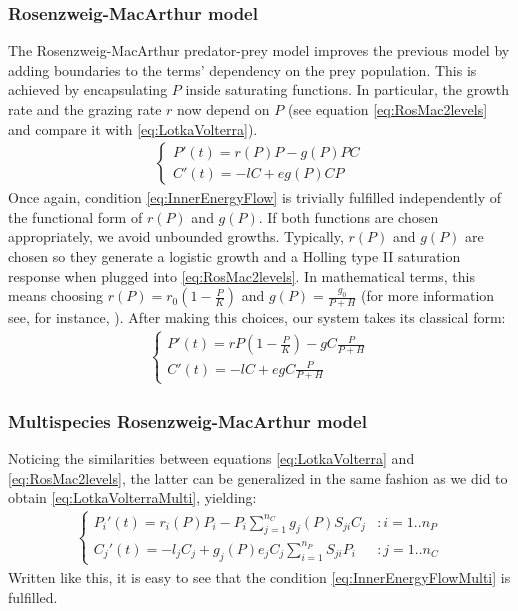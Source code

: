 \subsubsection{Rosenzweig-MacArthur model}
\label{subsubsec:Rosenzweig-MacArthur}
The Rosenzweig-MacArthur predator-prey model improves the previous model by adding boundaries to the terms' dependency on the prey population. This is achieved by encapsulating $P$ inside saturating functions. In particular, the growth rate and the grazing rate $r$ now depend on $P$ (see equation \ref{eq:RosMac2levels} and compare it with \ref{eq:LotkaVolterra}).
%
\begin{eqnarray}
\label{eq:RosMac2levels}
	\begin{cases}
	P'(t) = r(P) P - g(P) P C
	\\
	C'(t) = - l C + e g(P) C P
	\end{cases}
\end{eqnarray}
%
Once again, condition \ref{eq:InnerEnergyFlow} is trivially fulfilled independently of the functional form of $r(P)$ and $g(P)$. If both functions are chosen appropriately, we avoid unbounded growths. Typically, $r(P)$ and $g(P)$ are chosen so they generate a logistic growth and a Holling type II saturation response when plugged into \ref{eq:RosMac2levels}. In mathematical terms, this means choosing $r(P) = r_0 \left(1 - \frac{P}{K} \right)$ and $g(P) = \frac{g_0}{P+H}$ (for more information see, for instance, \citet{Edelstein-Keshet}). After making this choices, our system takes its classical form:
%
\begin{eqnarray}
\label{eq:RosMac2classic}
	\begin{cases}
	P'(t) =  r P \left( 1 - \frac{P}{K} \right) - g C \frac{P}{P + H}
	\\
	C'(t) = - l C + e g C \frac{P}{P + H}
	\end{cases}
\end{eqnarray}
%

\subsubsection{Multispecies Rosenzweig-MacArthur model}
\label{subsubsec:Rosenzweig-MacArthurMulti}

Noticing the similarities between equations \ref{eq:LotkaVolterra} and \ref{eq:RosMac2levels}, the latter can be generalized in the same fashion as we did to obtain \ref{eq:LotkaVolterraMulti}, yielding:
%
\begin{eqnarray}
\label{eq:RosMacMulti}
	\begin{cases}
	P_i'(t) = r_i(P) P_i - P_i \sum_{j = 1}^{n_C} g_j(P) S_{ji} C_j & : i = 1..n_P
	\\
	C_j'(t) = - l_j C_j +  g_j(P) e_j C_j \sum_{i = 1}^{n_P} S_{ji} P_i  & : j = 1..n_C
	\end{cases}
\end{eqnarray}
%
Written like this, it is easy to see that the condition \ref{eq:InnerEnergyFlowMulti} is fulfilled.

